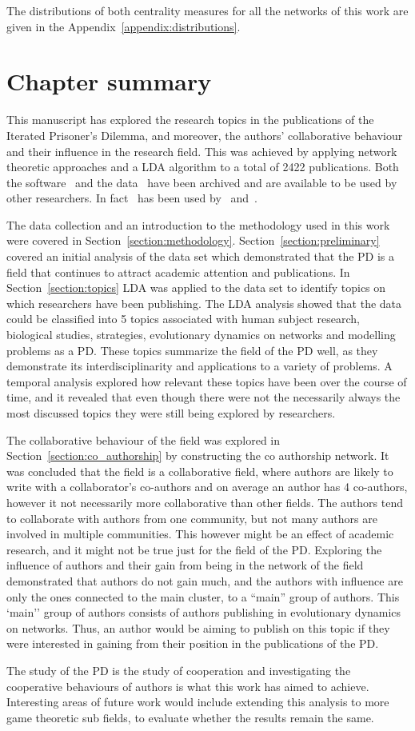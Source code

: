 The distributions of both centrality measures for all the networks of this
work are given in the Appendix~\ref{appendix:distributions}.

\section{Chapter summary}\label{section:conclusion}

This manuscript has explored the research topics in the publications of the
Iterated Prisoner's Dilemma, and moreover, the authors' collaborative behaviour
and their influence in the research field. This was achieved by
applying network theoretic approaches and a LDA algorithm to a total of 2422
publications. Both the software~\cite{nikoleta_2017} and the data~\cite{nikoleta_2017}
have been archived and are available to be used by other researchers. In
fact~\cite{nikoleta_2017} has been used by~\cite{brane} and~\cite{arcas_blog}.

The data collection and an introduction to the methodology used in this work
were covered in Section~\ref{section:methodology}.
Section~\ref{section:preliminary} covered an initial analysis of the data set
which demonstrated that the PD is a field that continues to attract academic
attention and publications. In Section~\ref{section:topics} LDA was
applied to the data set to identify topics on which researchers have been
publishing. The LDA analysis showed that the data could be classified into 5
topics associated with human subject research, biological studies, strategies,
evolutionary dynamics on networks and modelling
problems as a PD. These topics summarize the field of the PD well, as they
demonstrate its interdisciplinarity and applications to a variety of problems. A
temporal analysis explored how relevant these topics have been over the course
of time, and it revealed that even though there were not the necessarily always
the most discussed topics they were still being explored by researchers.

The collaborative behaviour of the field was explored in
Section~\ref{section:co_authorship} by constructing the co authorship network.
It was concluded that the field is a collaborative field, where authors are
likely to write with a collaborator's co-authors and on average an author has 4
co-authors, however it not necessarily more collaborative than other fields. The
authors tend to collaborate with authors from one community, but not many
authors are involved in multiple communities. This however
might be an effect of academic research, and it might not be true just for the
field of the PD. Exploring the influence of authors and their gain from being in
the network of the field demonstrated that authors do not gain much, and the
authors with influence are only the ones connected to the main cluster, to a
``main'' group of authors. This `main'' group of authors consists of authors
publishing in evolutionary dynamics on networks. Thus, an author would be aiming
to publish on this topic if they were interested in gaining from their position
in the publications of the PD.

The study of the PD is the study of cooperation and investigating
the cooperative behaviours of authors is what this work has aimed to achieve.
Interesting areas of future work would include extending this analysis to more
game theoretic sub fields, to evaluate whether the results remain the same.